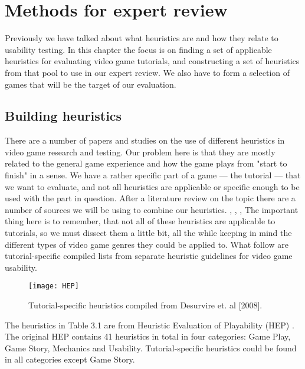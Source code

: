 \chapter{Methods for expert review}
Previously we have talked about what heuristics are and how they relate to usability testing. In this chapter the focus is on finding a set of applicable heuristics for evaluating video game tutorials, and constructing a set of heuristics from that pool to use in our expert review. We also have to form a selection of games that will be the target of our evaluation.

\section{Building heuristics}
There are a number of papers and studies on the use of different heuristics in video game research and testing. Our problem here is that they are mostly related to the general game experience and how the game plays from "start to finish" in a sense. We have a rather specific part of a game --- the tutorial --- that we want to evaluate, and not all heuristics are applicable or specific enough to be used with the part in question. After a literature review on the topic there are a number of sources we will be using to combine our heuristics. \cite{Desurvire2004}, \cite{Desurvire2009}, \cite{Federoff2002}, \cite{Pinelle2008}
The important thing here is to remember, that not all of these heuristics are applicable to tutorials, so we must dissect them a little bit, all the while keeping in mind the different types of video game genres they could be applied to. What follow are tutorial-specific compiled lists from separate heuristic guidelines for video game usability.



\begin{figure}
	\centering
	\texttt{[image: HEP]}
	\caption{Tutorial-specific heuristics compiled from Desurvire et. al [2008].}
\end{figure}
\clearpage

The heuristics in Table 3.1 are from Heuristic Evaluation of Playability (HEP) \cite{Desurvire2004}. The original HEP contains 41 heuristics in total in four categories: Game Play, Game Story, Mechanics and Usability. Tutorial-specific heuristics could be found in all categories except Game Story.

